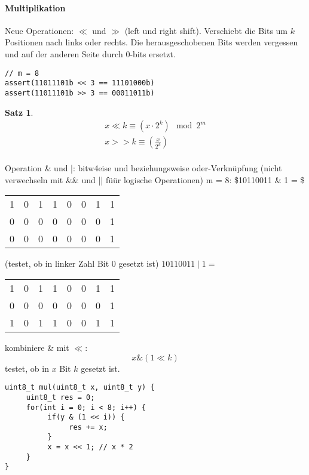 \documentclass[a4paper]{scrartcl}
\theoremstyle{definition}
\theoremstyle{plain}
\newtheorem{thm}{Satz}
\theoremstyle{remark}
\theoremstyle{remark}
\begin{document}
\paragraph{Multiplikation}
\label{sec-16-1-2-2}
Neue Operationen: $\ll$  und $\gg$ (left und right shift). Verschiebt die Bits um $k$ Positionen nach
links oder rechts. Die herausgeschobenen Bits werden vergessen und auf der anderen Seite durch
$0$-bits ersetzt.

\begin{verbatim}
// m = 8
assert(11011101b << 3 == 11101000b)
assert(11011101b >> 3 == 00011011b)
\end{verbatim}
\begin{thm}
\begin{align*}
x \ll k \equiv (x \cdot 2^k) \mod 2^m \\
x >> k \equiv (\frac{x}{2^k}) \\
\end{align*}
\end{thm}
Operation \& und |: bitw4eise und beziehungsweise oder-Verknüpfung (nicht verwechseln mit \&\& und || füür logische Operationen)
m = 8:
\$10110011 \& 1 = \$
\begin{center}
\begin{tabular}{rrrrrrrr}
1 & 0 & 1 & 1 & 0 & 0 & 1 & 1\\
0 & 0 & 0 & 0 & 0 & 0 & 0 & 1\\
0 & 0 & 0 & 0 & 0 & 0 & 0 & 1\\
\end{tabular}
\end{center}
(testet, ob in linker Zahl Bit 0 gesetzt ist)
$10110011 \mid 1 =$
\begin{center}
\begin{tabular}{rrrrrrrr}
1 & 0 & 1 & 1 & 0 & 0 & 1 & 1\\
0 & 0 & 0 & 0 & 0 & 0 & 0 & 1\\
1 & 0 & 1 & 1 & 0 & 0 & 1 & 1\\
\end{tabular}
\end{center}
kombiniere \& mit $\ll$:
\[x \& (1 \ll k)\]
testet, ob in $x$ Bit $k$ gesetzt ist.
\begin{verbatim}
uint8_t mul(uint8_t x, uint8_t y) {
	 uint8_t res = 0;
	 for(int i = 0; i < 8; i++) {
		  if(y & (1 << i)) {
			   res += x;
		  }
		  x = x << 1; // x * 2
	 }
}
\end{verbatim}
\end{document}
